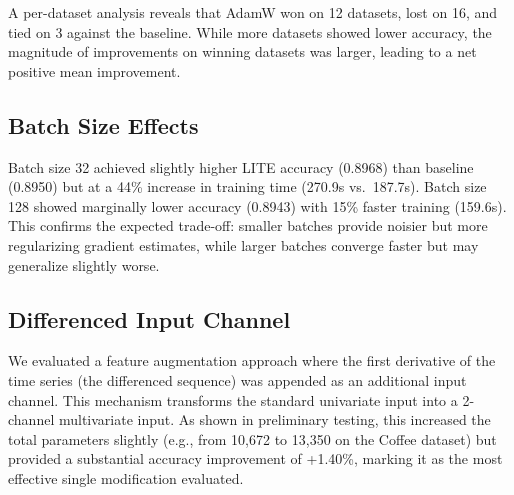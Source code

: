 \documentclass[conference]{IEEEtran}
\begin{document}
A per-dataset analysis reveals that AdamW won on 12 datasets, lost on 16, and tied on 3 against the baseline. While more datasets showed lower accuracy, the magnitude of improvements on winning datasets was larger, leading to a net positive mean improvement.

\subsection{Batch Size Effects}

Batch size 32 achieved slightly higher LITE accuracy (0.8968) than baseline (0.8950) but at a 44\% increase in training time (270.9s vs.\ 187.7s). Batch size 128 showed marginally lower accuracy (0.8943) with 15\% faster training (159.6s). This confirms the expected trade-off: smaller batches provide noisier but more regularizing gradient estimates, while larger batches converge faster but may generalize slightly worse.

\subsection{Differenced Input Channel}

We evaluated a feature augmentation approach where the first derivative of the time series (the differenced sequence) was appended as an additional input channel. This mechanism transforms the standard univariate input into a 2-channel multivariate input. As shown in preliminary testing, this increased the total parameters slightly (e.g., from 10,672 to 13,350 on the Coffee dataset) but provided a substantial accuracy improvement of +1.40\%, marking it as the most effective single modification evaluated.

\begin{table}[htbp]
\caption{Improvement Experiment Results (31-Dataset Fast Subset)}
\label{tab:improvements}
\centering
{}
\end{table}
\end{document}
